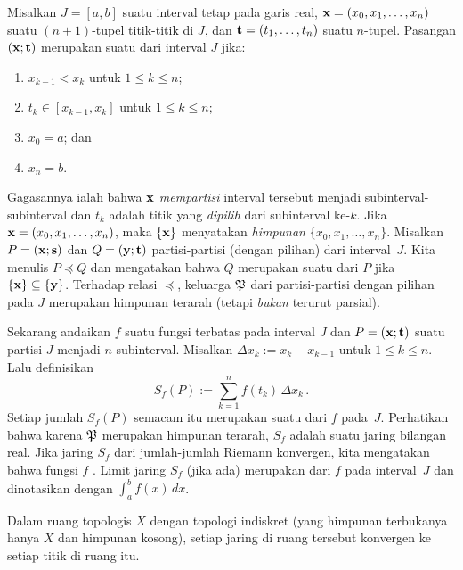 \begin{exam}\label{C031437} Misalkan $J = [a,b]$ suatu interval tetap pada garis real,
$\mathbf{x} = (x_0,x_1,\dots,x_n)$ suatu $(n+1)$-tupel titik-titik di $J$, dan $\mathbf{t} =
(t_1,\dots,t_n)$ suatu $n$-tupel. Pasangan $(\mathbf{x};\mathbf{t})$ merupakan suatu
 dari interval $J$ jika:
 \begin{enumerate}
  \item $x_{k-1} < x_k$ untuk $1 \le k \le n$;
  \item $t_k \in [x_{k-1},x_k]$ untuk $1 \le k \le n$;
  \item $x_0 = a$; dan
  \item $x_n = b$.
 \end{enumerate}
Gagasannya ialah bahwa $\mathbf{x}$ \emph{mempartisi} interval tersebut menjadi subinterval-subinterval dan $t_k$ adalah
titik yang \emph{dipilih} dari subinterval $\text{ke-}k$. Jika $\mathbf{x} =
(x_0,x_1,\dots,x_n)$, maka $\{\mathbf{x}\}$ menyatakan \emph{himpunan} $\{x_0,x_1,\dots,x_n\}$.
Misalkan $P = (\mathbf{x};\mathbf{s})$ dan $Q = (\mathbf{y};\mathbf{t})$ partisi-partisi (dengan pilihan) dari
interval~$J$. Kita menulis $P \preccurlyeq Q$ dan mengatakan bahwa $Q$ merupakan suatu
 dari $P$ jika $\{\mathbf{x}\} \subseteq \{\mathbf{y}\}$. Terhadap relasi
$\preccurlyeq$, keluarga $\mathfrak{P}$ dari partisi-partisi dengan pilihan pada $J$ merupakan himpunan terarah
(tetapi \emph{bukan} terurut parsial).

Sekarang andaikan $f$ suatu fungsi terbatas pada interval $J$ dan $P = (\mathbf{x};\mathbf{t})$ suatu
partisi $J$ menjadi $n$ subinterval. Misalkan $\Delta x_k := x_k - x_{k-1}$ untuk $1 \le k
\le n$. Lalu definisikan
   \[ S_f(P) := \sum_{k=1}^n f(t_k)\,\Delta x_k\,. \]
Setiap jumlah $S_f(P)$ semacam itu merupakan suatu
 dari $f$ pada~$J$. Perhatikan bahwa karena $\mathfrak{P}$ merupakan himpunan terarah, $S_f$ adalah suatu
jaring bilangan real. Jika jaring $S_f$ dari jumlah-jumlah Riemann konvergen, kita mengatakan bahwa fungsi
$f$
. Limit jaring $S_f$ (jika ada) merupakan
 dari $f$ pada interval~$J$ dan dinotasikan dengan $\int_a^b f(x)\,dx$.
\end{exam}

\begin{exam}\label{exam_net_indiscrete} Dalam ruang topologis $X$ dengan topologi
indiskret (yang himpunan terbukanya hanya $X$ dan himpunan kosong), setiap jaring di ruang tersebut
konvergen ke setiap titik di ruang itu.
\end{exam}

